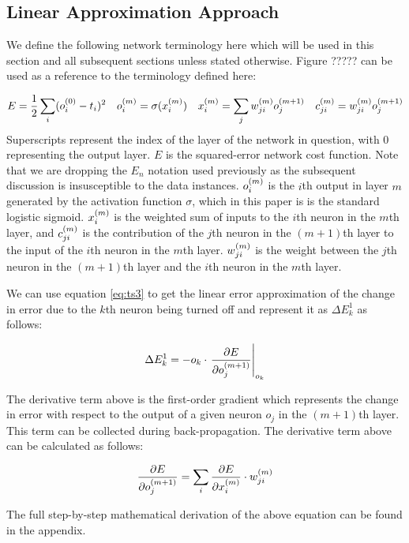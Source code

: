 \subsection{Linear Approximation Approach}

We define the following network terminology here which will be used in this section and all subsequent sections  unless stated otherwise. Figure ????? can be used as a reference to the terminology defined here:

\begin{align}
E &= \frac{1}{2}\sum\limits_i (o_{i}^{(0)} - t_{i})^2 &
o_{i}^{(m)} &= \sigma(x_{i}^{(m)}) &
x_{i}^{(m)} &= \sum\limits_j {w_{ji}^{(m)}}{ o_{j}^{(m + 1)}} &
c_{ji}^{(m)} = w_{ji}^{(m)} o_{j}^{(m+1)}\label{eq:term}
\end{align}
Superscripts represent the index of the layer of the network in question, with 0 representing the output layer. $E$ is the squared-error network cost function. Note that we are dropping the $E_n$ notation used previously as the subsequent discussion is insusceptible to the data instances. $o_{i}^{(m)}$ is the $i$th output in layer $m$ generated by the activation function $\sigma$, which in this paper is is the standard logistic sigmoid. $x_{i}^{(m)}$ is the weighted sum of inputs to the $i$th neuron in the $m$th layer, and $c_{ji}^{(m)}$ is the contribution of the $j$th neuron in the $(m+1)$th layer to the input of the $i$th neuron in the $m$th layer. $w_{ji}^{(m)}$ is the weight between the $j$th neuron in the $(m+1)$th layer and the $i$th neuron in the $m$th layer.

We can use equation \ref{eq:ts3} to get the linear error approximation of the change in error due to the $k$th neuron being turned off and represent it as $\Delta E_{k}^1$ as follows:

\begin{align}
\Delta E_{k}^1 = - o_k\cdot \left.\pdv{E}{{o_{j}^{(m+1)}}}\right|_{o_k}
\end{align}

The derivative term above is the first-order gradient which represents the change in error with respect to the output of a given neuron $o_j$ in the $(m+1)$th layer. This term can be collected during back-propagation. The derivative term above can be calculated as follows:

\begin{align}
\pdv{E}{{o_{j}^{(m+1)}}} = \sum\limits_i \pdv{E}{x_{i}^{(m)}}\cdot w_{ji}^{(m)}
\end{align}

The full step-by-step mathematical derivation of the above equation can be found in the appendix.
